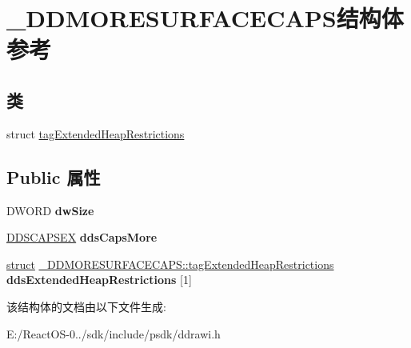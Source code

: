 \hypertarget{struct___d_d_m_o_r_e_s_u_r_f_a_c_e_c_a_p_s}{}\section{\+\_\+\+D\+D\+M\+O\+R\+E\+S\+U\+R\+F\+A\+C\+E\+C\+A\+P\+S结构体 参考}
\label{struct___d_d_m_o_r_e_s_u_r_f_a_c_e_c_a_p_s}
\subsection*{类}
\begin{DoxyCompactItemize}
\item 
struct \hyperlink{struct___d_d_m_o_r_e_s_u_r_f_a_c_e_c_a_p_s_1_1tag_extended_heap_restrictions}{tag\+Extended\+Heap\+Restrictions}
\end{DoxyCompactItemize}
\subsection*{Public 属性}
\begin{DoxyCompactItemize}
\item 
\mbox{\label{struct___d_d_m_o_r_e_s_u_r_f_a_c_e_c_a_p_s_a178a52b69dc2da320e71a9310c7f1979}} 
D\+W\+O\+RD {\bfseries dw\+Size}
\item 
\mbox{\label{struct___d_d_m_o_r_e_s_u_r_f_a_c_e_c_a_p_s_ad904e14b2ea3cf86db67e0db3db53f37}} 
\hyperlink{struct___d_d_s_c_a_p_s_e_x}{D\+D\+S\+C\+A\+P\+S\+EX} {\bfseries dds\+Caps\+More}
\item 
\mbox{\label{struct___d_d_m_o_r_e_s_u_r_f_a_c_e_c_a_p_s_a450033682ca1263bcfff7558c1a38ed9}} 
\hyperlink{interfacestruct}{struct} \hyperlink{struct___d_d_m_o_r_e_s_u_r_f_a_c_e_c_a_p_s_1_1tag_extended_heap_restrictions}{\+\_\+\+D\+D\+M\+O\+R\+E\+S\+U\+R\+F\+A\+C\+E\+C\+A\+P\+S\+::tag\+Extended\+Heap\+Restrictions} {\bfseries dds\+Extended\+Heap\+Restrictions} \mbox{[}1\mbox{]}
\end{DoxyCompactItemize}


该结构体的文档由以下文件生成\+:\begin{DoxyCompactItemize}
\item 
E\+:/\+React\+O\+S-\/0../sdk/include/psdk/ddrawi.\+h\end{DoxyCompactItemize}
